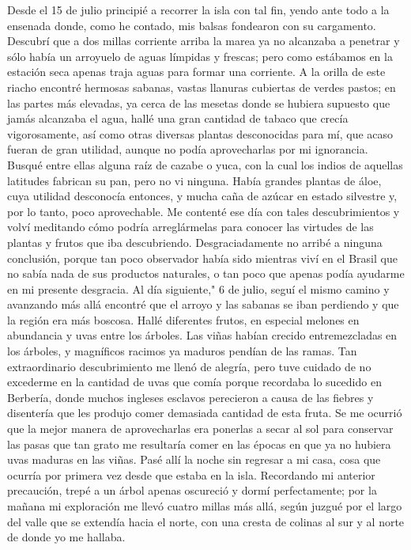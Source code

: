 \documentclass{novela}
\begin{document}
    Desde el 15 de julio principié a recorrer la isla con tal fin, yendo ante todo a la ensenada donde, como he contado, mis balsas fondearon con su cargamento. Descubrí que a dos millas corriente arriba la marea ya no alcanzaba a penetrar y sólo había un arroyuelo de aguas límpidas y frescas; pero como estábamos en la estación seca apenas traja aguas para formar una corriente.
    A la orilla de este riacho encontré hermosas sabanas, vastas llanuras cubiertas de verdes pastos; en las partes más elevadas, ya cerca de las mesetas donde se hubiera supuesto que jamás alcanzaba el agua, hallé una gran cantidad de tabaco que crecía vigorosamente, así como otras diversas plantas desconocidas para mí, que acaso fueran de gran utilidad, aunque no podía aprovecharlas por mi ignorancia.
    Busqué entre ellas alguna raíz de cazabe o yuca, con la cual los indios de aquellas latitudes fabrican su pan, pero no vi ninguna. Había grandes plantas de áloe, cuya utilidad desconocía entonces, y mucha caña de azúcar en estado silvestre y, por lo tanto, poco aprovechable. Me contenté ese día con tales descubrimientos y volví meditando cómo podría arreglármelas para conocer las virtudes de las plantas y frutos que iba descubriendo. Desgraciadamente no arribé a ninguna conclusión, porque tan poco observador había sido mientras viví en el Brasil que no sabía nada de sus productos naturales, o tan poco que apenas podía ayudarme en mi presente desgracia.
    Al día siguiente," 6 de julio, seguí el mismo camino y avanzando más allá encontré que el arroyo y las sabanas se iban perdiendo y que la región era más boscosa. Hallé diferentes frutos, en especial melones en abundancia y uvas entre los árboles. Las viñas habían crecido entremezcladas en los árboles, y magníficos racimos ya maduros pendían de las ramas. Tan extraordinario descubrimiento me llenó de alegría, pero tuve cuidado de no excederme en la cantidad de uvas que comía porque recordaba lo sucedido en Berbería, donde muchos ingleses esclavos perecieron a causa de las fiebres y disentería que les produjo comer demasiada cantidad de esta fruta. Se me ocurrió que la mejor manera de aprovecharlas era ponerlas a secar al sol para conservar las pasas que tan grato me resultaría comer en las épocas en que ya no hubiera uvas maduras en las viñas. Pasé allí la noche sin regresar a mi casa, cosa que ocurría por primera vez desde que estaba en la isla. Recordando mi anterior precaución, trepé a un árbol apenas oscureció y dormí perfectamente; por la mañana mi exploración me llevó cuatro millas más allá, según juzgué por el largo del valle que se extendía hacia el norte, con una cresta de colinas al sur y al norte de donde yo me hallaba.
\end{document}
